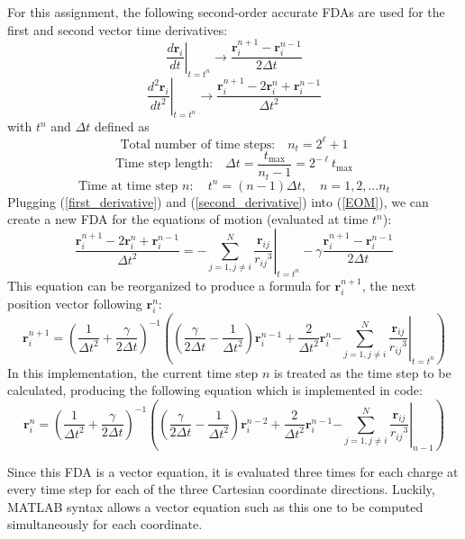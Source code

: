\documentclass[10pt]{article}
\begin{document}
For this assignment, the following second-order accurate FDAs are used for the first and second vector
time derivatives: 
\begin{equation}\label{first_derivative}
\left.\frac{d \mathbf{r}_i}{d t}\right|_{t=t^n} 
\rightarrow \frac{\mathbf{r}_i^{n+1}-\mathbf{r}_i^{n-1}}{2 \Delta t}
\end{equation}
\begin{equation}\label{second_derivative}
\left.\frac{d^2 \mathbf{r}_i}{d t^2}\right|_{t=t^n} 
\rightarrow \frac{\mathbf{r}_i^{n+1}-2 \mathbf{r}_i^n+\mathbf{r}_i^{n-1}}{\Delta t^2}
\end{equation}
with $t^n$ and $\Delta t$ defined as 
$$ \textrm{Total number of time steps:} \quad n_t=2^{\ell}+1 $$
$$ \textrm{Time step length:} \quad \Delta t=\frac{t_{\max }}{n_t-1}=2^{-\ell} t_{\max } $$
$$ \textrm{Time at time step } n: \quad t^n=(n-1) \Delta t, \quad n=1,2, \ldots n_t $$
Plugging (\ref{first_derivative}) and (\ref{second_derivative}) into (\ref{EOM}), we can create a new
FDA for the equations of motion (evaluated at time $t^n$):
$$ \frac{\mathbf{r}_i^{n+1}-2 \mathbf{r}_i^n+\mathbf{r}_i^{n-1}}{\Delta t^2} 
=\left.-\sum_{j=1, j \neq i}^N \frac{\mathbf{r}_{i j}}{r_{i j}{ }^3}\right|_{t=t^n}-
\gamma \frac{\mathbf{r}_i^{n+1}-\mathbf{r}_i^{n-1}}{2 \Delta t} $$
This equation can be reorganized to produce a formula for $\mathbf{r}_i^{n+1}$, the next position vector
following $\mathbf{r}_i^n$:
$$ \mathbf{r}_i^{n+1} = \left( \frac{1}{\Delta t^2} + \frac{\gamma}{2\Delta t} \right)^{-1} 
\left( \left( \frac{\gamma}{2\Delta t} - \frac{1}{\Delta t^2} \right) \mathbf{r}_i^{n-1} +
\frac{2}{\Delta t^2} \mathbf{r}_i^n \left.-\sum_{j=1, j \neq i}^N \frac{\mathbf{r}_{i j}}{r_{i j}{ }^3}
\right|_{t=t^n} \right) $$
In this implementation, the current time step $n$ is treated as the time step to be calculated, 
producing the following equation which is implemented in code:
\begin{equation}\label{FDA}
\mathbf{r}_i^{n} = \left( \frac{1}{\Delta t^2} + \frac{\gamma}{2\Delta t} \right)^{-1} 
\left( \left( \frac{\gamma}{2\Delta t} - \frac{1}{\Delta t^2} \right) \mathbf{r}_i^{n-2} +
\frac{2}{\Delta t^2} \mathbf{r}_i^{n-1} \left.-\sum_{j=1, j \neq i}^N \frac{\mathbf{r}_{i j}}{r_{i j}{ }^3}
\right|_{n-1} \right) 
\end{equation}

Since this FDA is a vector equation, it is evaluated three times for each charge at every time step for
each of the three Cartesian coordinate directions. Luckily, MATLAB syntax allows a vector equation such
as this one to be computed simultaneously for each coordinate. 
\end{document}
